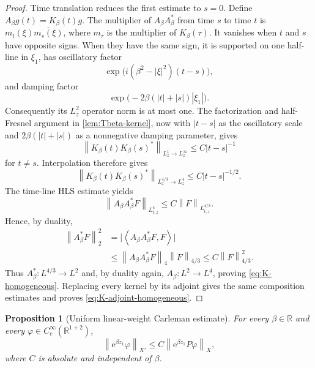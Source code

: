 \documentclass[11pt,oneside]{book}
\newtheorem{proposition}[theorem]{Proposition}
\theoremstyle{definition}
\theoremstyle{remark}
\newcommand{\R}{\mathbb R}
\newcommand{\1}{\mathbf 1}
\newcommand{\norm}[1]{\left\lVert #1\right\rVert}
\newcommand{\pair}[2]{\left\langle #1,#2\right\rangle}
\newcommand{\e}{\mathrm e}
\begin{document}
\begin{proof}
Time translation reduces the first estimate to $s=0$.  Define
$A_\beta g(t)=K_\beta(t)g$.  The multiplier of
$A_\beta A_\beta^*$ from time $s$ to time $t$ is
$m_t(\xi)\overline{m_s(\xi)}$, where $m_\tau$ is the multiplier of
$K_\beta(\tau)$.  It vanishes when $t$ and $s$ have opposite signs.  When
they have the same sign, it is supported on one half-line in $\xi_1$, has
oscillatory factor
\[
 \exp\big(i(\beta^2-|\xi|^2)(t-s)\big),
\]
and damping factor
\[
 \exp\big(-2\beta(|t|+|s|)|\xi_1|\big).
\]
Consequently its $L^2_z$ operator norm is at most one.  The factorization and
half-Fresnel argument in \cref{lem:Tbeta-kernel}, now with
$|t-s|$ as the oscillatory scale and
$2\beta(|t|+|s|)$ as a nonnegative damping parameter, gives
\[
 \norm{K_\beta(t)K_\beta(s)^*}_{L^1_z\to L^\infty_z}
 \le C|t-s|^{-1}
\]
for $t\ne s$.  Interpolation therefore gives
\[
 \norm{K_\beta(t)K_\beta(s)^*}_{L^{4/3}_z\to L^4_z}
 \le C|t-s|^{-1/2}.
\]
The time-line HLS estimate yields
\[
 \norm{A_\beta A_\beta^*F}_{L^4_{t,z}}
 \le C\norm F_{L^{4/3}_{t,z}}.
\]
Hence, by duality,
\begin{align*}
 \norm{A_\beta^*F}_2^2
 &=\big|\pair{A_\beta A_\beta^*F}{F}\big|\\
 &\le \norm{A_\beta A_\beta^*F}_4\norm F_{4/3}
 \le C\norm F_{4/3}^2.
\end{align*}
Thus $A_\beta^*:L^{4/3}\to L^2$ and, by duality again,
$A_\beta:L^2\to L^4$, proving \eqref{eq:K-homogeneous}.  Replacing every
kernel by its adjoint gives the same composition estimates and proves
\eqref{eq:K-adjoint-homogeneous}.
\end{proof}

\begin{proposition}[Uniform linear-weight Carleman estimate]
\label{prop:linear-carleman}
For every $\beta\in\R$ and every $\varphi\in C_c^\infty(\R^{1+2})$,
\begin{equation}
 \norm{\e^{\beta z_1}\varphi}_{X'}
 \le C\norm{\e^{\beta z_1}P\varphi}_{X},           \label{eq:linear-carleman}
\end{equation}
where $C$ is absolute and independent of $\beta$.
\end{proposition}
\end{document}
